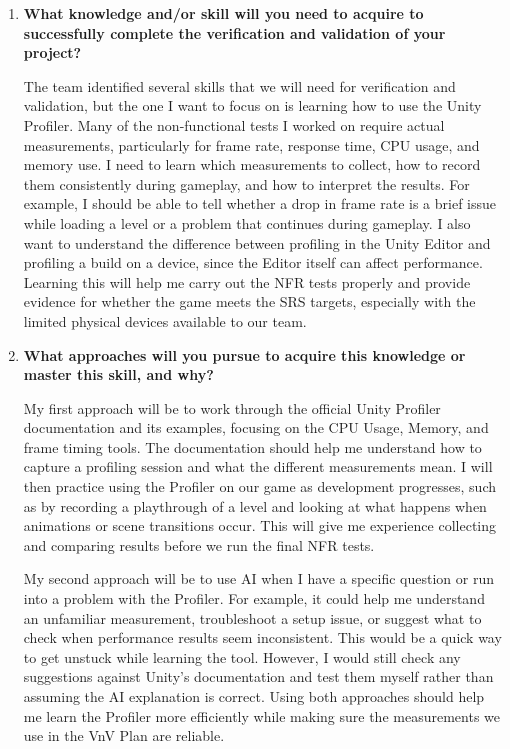 \documentclass[10pt,titlepage]{article}
\begin{document}
\begin{enumerate}
    \item \textbf{What knowledge and/or skill will you need to acquire to successfully complete
    the verification and validation of your project?}

    The team identified several skills that we will need for verification and
    validation, but the one I want to focus on is learning how to use the Unity
    Profiler. Many of the non-functional tests I worked on require actual
    measurements, particularly for frame rate, response time, CPU usage, and
    memory use. I need to learn which measurements to collect, how to record
    them consistently during gameplay, and how to interpret the results. For
    example, I should be able to tell whether a drop in frame rate is a brief
    issue while loading a level or a problem that continues during gameplay.
    I also want to understand the difference between profiling in the Unity
    Editor and profiling a build on a device, since the Editor itself can
    affect performance. Learning this will help me carry out the NFR tests
    properly and provide evidence for whether the game meets the SRS targets,
    especially with the limited physical devices available to our team.

    \item \textbf{What approaches will you pursue to acquire this
    knowledge or master this skill, and why?}

    My first approach will be to work through the official Unity Profiler
    documentation and its examples, focusing on the CPU Usage, Memory, and
    frame timing tools. The documentation should help me understand how to
    capture a profiling session and what the different measurements mean.
    I will then practice using the Profiler on our game as development
    progresses, such as by recording a playthrough of a level and looking at
    what happens when animations or scene transitions occur. This will give
    me experience collecting and comparing results before we run the final
    NFR tests.

    My second approach will be to use AI when I have a specific question or
    run into a problem with the Profiler. For example, it could help me
    understand an unfamiliar measurement, troubleshoot a setup issue, or
    suggest what to check when performance results seem inconsistent. This
    would be a quick way to get unstuck while learning the tool. However, I
    would still check any suggestions against Unity's documentation and test
    them myself rather than assuming the AI explanation is correct. Using
    both approaches should help me learn the Profiler more efficiently while
    making sure the measurements we use in the VnV Plan are reliable.

\end{enumerate}
\end{document}
